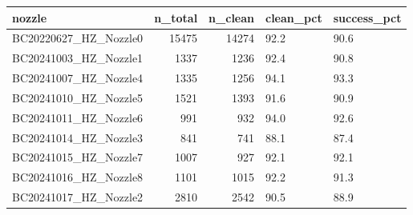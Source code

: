 \begin{tabular}{lrrll}
\toprule
nozzle & n\_total & n\_clean & clean\_pct & success\_pct \\
\midrule
BC20220627\_HZ\_Nozzle0 & 15475 & 14274 & 92.2 & 90.6 \\
BC20241003\_HZ\_Nozzle1 & 1337 & 1236 & 92.4 & 90.8 \\
BC20241007\_HZ\_Nozzle4 & 1335 & 1256 & 94.1 & 93.3 \\
BC20241010\_HZ\_Nozzle5 & 1521 & 1393 & 91.6 & 90.9 \\
BC20241011\_HZ\_Nozzle6 & 991 & 932 & 94.0 & 92.6 \\
BC20241014\_HZ\_Nozzle3 & 841 & 741 & 88.1 & 87.4 \\
BC20241015\_HZ\_Nozzle7 & 1007 & 927 & 92.1 & 92.1 \\
BC20241016\_HZ\_Nozzle8 & 1101 & 1015 & 92.2 & 91.3 \\
BC20241017\_HZ\_Nozzle2 & 2810 & 2542 & 90.5 & 88.9 \\
\bottomrule
\end{tabular}
